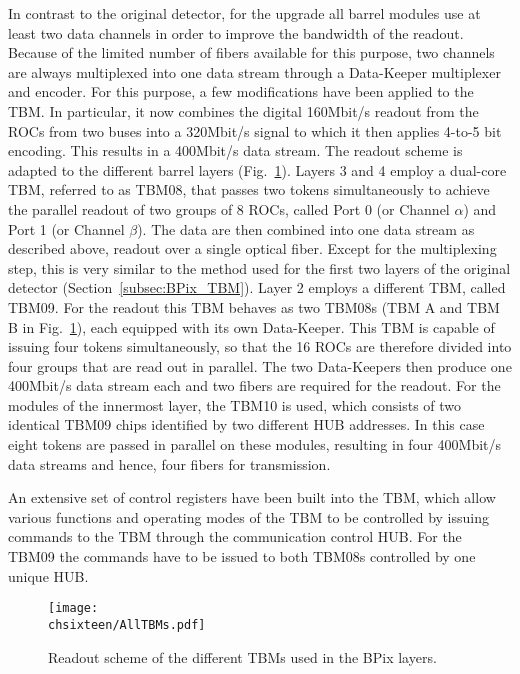In contrast to the original detector, for the upgrade all barrel modules use at least two data channels in order to improve the bandwidth of the readout.
Because of the limited number of fibers available for this purpose, two channels are always multiplexed into one data stream through a Data-Keeper multiplexer and encoder.
For this purpose, a few modifications have been applied to the TBM.
In particular, it now combines the digital 160\unit{Mbit/s} readout from the ROCs from two buses into a 320\unit{Mbit/s} signal to which it then applies 4-to-5 bit encoding. This results in a 400\unit{Mbit/s} data stream.
The readout scheme is adapted to the different barrel layers (Fig.~\ref{fig:Phase1TBMRO}).
Layers 3 and 4 employ a dual-core TBM, referred to as TBM08, that passes two tokens simultaneously to achieve the parallel readout of two groups of 8 ROCs, called Port 0 (or Channel $\alpha$) and Port 1 (or Channel $\beta$). 
The data are then combined into one data stream as described above, readout over a single optical fiber. Except for the multiplexing step, this is very similar to the method used for the first two layers of the original detector (Section~\ref{subsec:BPix_TBM}).
Layer 2 employs a different TBM, called TBM09. For the readout this TBM behaves as two TBM08s (TBM A and TBM B in Fig.~\ref{fig:Phase1TBMRO}), each equipped with its own Data-Keeper. This TBM is capable of issuing four tokens simultaneously, so that the 16 ROCs are therefore divided into four groups that are read out in parallel. The two Data-Keepers then produce one 400\unit{Mbit/s} data stream each and two fibers are required for the readout.
For the modules of the innermost layer, the TBM10 is used, which consists of two identical TBM09 chips identified by two different HUB addresses. In this case eight tokens are passed in parallel on these modules, resulting in four 400\unit{Mbit/s} data streams and hence, four fibers for transmission.

An extensive set of control registers have been built into the TBM, which allow various functions and operating modes of the TBM to be controlled by issuing commands to the TBM through the communication control HUB.
For the TBM09 the commands have to be issued to both TBM08s controlled by one unique HUB.

\begin{figure}[!htb]
 \begin{center}
 \texttt{[image: \\chsixteen/AllTBMs.pdf]}
 \end{center}
 \caption{Readout scheme of the different TBMs used in the BPix layers.}
 \label{fig:Phase1TBMRO}
\end{figure}


